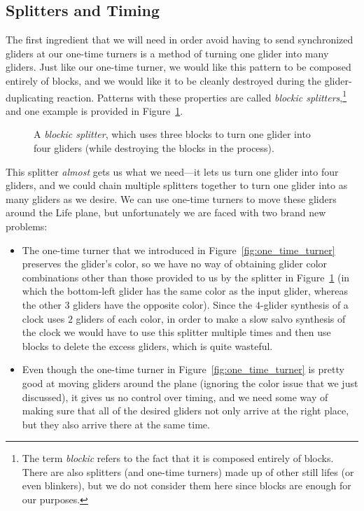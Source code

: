 \subsection{Splitters and Timing}\label{sec:slow_salvo_splitters}

The first ingredient that we will need in order avoid having to send synchronized gliders at our one-time turners is a method of turning one glider into many gliders. Just like our one-time turner, we would like this pattern to be composed entirely of blocks, and we would like it to be cleanly destroyed during the glider-duplicating reaction. Patterns with these properties are called \emph{blockic splitters},\footnote{The term \emph{blockic} refers to the fact that it is composed entirely of blocks. There are also splitters (and one-time turners) made up of other still lifes (or even blinkers), but we do not consider them here since blocks are enough for our purposes.} and one example is provided in Figure~\ref{fig:one_time_splitter}.

\begin{figure}[!ht]
	\centering{}
	\caption{A \emph{blockic splitter}, which uses three blocks to turn one glider into four gliders (while destroying the blocks in the process).}\label{fig:one_time_splitter}
\end{figure}

This splitter \emph{almost} gets us what we need---it lets us turn one glider into four gliders, and we could chain multiple splitters together to turn one glider into as many gliders as we desire. We can use one-time turners to move these gliders around the Life plane, but unfortunately we are faced with two brand new problems:
\begin{itemize}
	\item The one-time turner that we introduced in Figure~\ref{fig:one_time_turner} preserves the glider's color, so we have no way of obtaining glider color combinations other than those provided to us by the splitter in Figure~\ref{fig:one_time_splitter} (in which the bottom-left glider has the same color as the input glider, whereas the other $3$ gliders have the opposite color). Since the $4$-glider synthesis of a clock uses $2$ gliders of each color, in order to make a slow salvo synthesis of the clock we would have to use this splitter multiple times and then use blocks to delete the excess gliders, which is quite wasteful.
	
	\item Even though the one-time turner in Figure~\ref{fig:one_time_turner} is pretty good at moving gliders around the plane (ignoring the color issue that we just discussed), it gives us no control over timing, and we need some way of making sure that all of the desired gliders not only arrive at the right place, but they also arrive there at the same time.
\end{itemize}

